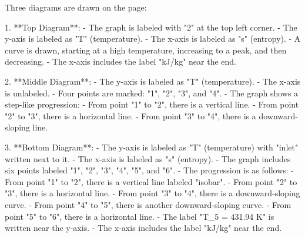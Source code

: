 Three diagrams are drawn on the page:

1. **Top Diagram**:  
   - The graph is labeled with "2" at the top left corner.  
   - The y-axis is labeled as "T" (temperature).  
   - The x-axis is labeled as "s" (entropy).  
   - A curve is drawn, starting at a high temperature, increasing to a peak, and then decreasing.  
   - The x-axis includes the label "kJ/kg" near the end.

2. **Middle Diagram**:  
   - The y-axis is labeled as "T" (temperature).  
   - The x-axis is unlabeled.  
   - Four points are marked: "1", "2", "3", and "4".  
   - The graph shows a step-like progression:  
     - From point "1" to "2", there is a vertical line.  
     - From point "2" to "3", there is a horizontal line.  
     - From point "3" to "4", there is a downward-sloping line.

3. **Bottom Diagram**:  
   - The y-axis is labeled as "T" (temperature) with "inlet" written next to it.  
   - The x-axis is labeled as "s" (entropy).  
   - The graph includes six points labeled "1", "2", "3", "4", "5", and "6".  
   - The progression is as follows:  
     - From point "1" to "2", there is a vertical line labeled "isobar".  
     - From point "2" to "3", there is a horizontal line.  
     - From point "3" to "4", there is a downward-sloping curve.  
     - From point "4" to "5", there is another downward-sloping curve.  
     - From point "5" to "6", there is a horizontal line.  
   - The label "T_5 = 431.94 K" is written near the y-axis.  
   - The x-axis includes the label "kJ/kg" near the end.